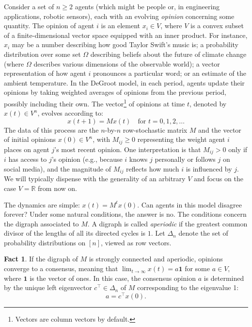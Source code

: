 \documentclass{notices}
\theoremstyle{definition}\newtheorem{problem}{Problem}
\theoremstyle{definition} \newtheorem{remark}{Remark}
\theoremstyle{definition} \newtheorem{claim}{Claim}
\theoremstyle{definition} \newtheorem{thm}{Theorem}
\theoremstyle{definition} \newtheorem*{thmNoNum}{Theorem}
\theoremstyle{definition} \newtheorem{definition}{Definition}
\theoremstyle{definition} \theoremstyle{remark}
\theoremstyle{definition} \newtheorem{note}{Note}
\theoremstyle{definition} \newtheorem{notation}{Notation}
\theoremstyle{definition} \theoremstyle{plain}
\theoremstyle{definition} \newtheorem{condition}{Condition}
\theoremstyle{definition} \newtheorem{lem}{Lemma}
\theoremstyle{definition} \newtheorem{corollary}{Corollary}
\theoremstyle{definition} \newtheorem{prop}{Proposition}
\theoremstyle{definition} \newtheorem{ax}{Axiom}
\theoremstyle{definition} \newtheorem{assumption}{Assumption}
\theoremstyle{definition} \newtheorem{example}{Example}
\theoremstyle{definition} \newtheorem{rmk}{Remark}
\theoremstyle{definition} \newtheorem{res}{Result}
\theoremstyle{definition} \newtheorem{que}{Question}
\theoremstyle{definition} \newtheorem{conjecture}{Conjecture}
\newtheorem{fact}{Fact}
\theoremstyle{definition}
\begin{document}
Consider a set of $n \geq 2$ agents (which might be people or, in engineering applications, robotic sensors), each with an evolving \emph{opinion} concerning some quantity. The opinion of agent $i$ is an element $x_i \in V$, where $V$ is a convex subset of a finite-dimensional vector space equipped with an inner product. For instance, $x_i$ may be a number describing how good Taylor Swift's music is; a probability distribution over some set $\Omega$ describing beliefs about the future of climate change (where $\Omega$ describes various dimensions of the observable world);  a vector representation of how agent $i$ pronounces a particular word; or an estimate of the ambient temperature. In the DeGroot model, in each period, agents update their opinions by taking weighted averages of opinions from the previous period, possibly including their own. The vector\footnote{Vectors are column vectors by default.} of opinions at time $t$, denoted by $x(t) \in V^n$, evolves according to:
$$ x(t+1) = Mx(t) \quad \text{for $t=0,1,2,\ldots$}$$ The data of this process are the $n$-by-$n$ row-stochastic matrix $M$ and the vector of initial opinions $x(0) \in V^n$, with $M_{ij} \geq 0$ representing the weight agent $i$ places on agent $j$'s most recent opinion. One interpretation is that \(M_{ij} > 0\) only if \(i\) has access to \(j\)'s opinion (e.g., because \(i\) knows \(j\) personally or follows \(j\) on social media), and the magnitude of \(M_{ij}\) reflects how much \(i\) is influenced by \(j\).  We will typically dispense with the generality of an arbitrary $V$ and focus on the case $V=\mathbb{R}$ from now on.



The dynamics are simple: $x(t) = M^t x(0)$. Can agents in this model disagree forever? Under some natural conditions, the answer is no. The conditions concern the digraph associated to $M$. A digraph is called \emph{aperiodic} if the greatest common divisor of the lengths of all its directed cycles is $1$. Let $\Delta_n$ denote the set of probability distributions on $[n]$, viewed as row vectors.

\begin{fact} \label{fact:degroot_convergence} If the digraph of $M$ is strongly connected and aperiodic, opinions converge to a consensus, meaning that $\lim_{t \to \infty} x(t) = a \mathbf{1}$ for some $a \in V$, where $\mathbf{1}$ is the vector of ones. In this case, the consensus opinion $a$ is determined by the unique left eigenvector $c^\top \in \Delta_n$ of $M$  corresponding to the eigenvalue 1:
$$ a = c^\top x(0). $$
\end{fact}
\end{document}
